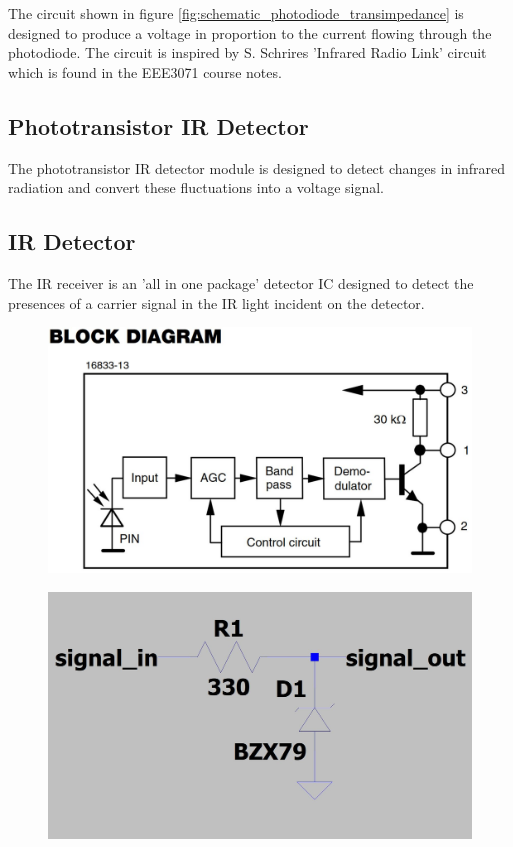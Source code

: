 The circuit shown in figure \ref{fig:schematic_photodiode_transimpedance} is designed to produce a voltage in proportion to the current flowing through the photodiode. The circuit is inspired by S. Schrires 'Infrared Radio Link' circuit which is found in the EEE3071 course notes\cite{Schrire2007}.

\subsection{Phototransistor IR Detector}


The phototransistor IR detector module is designed to detect changes in infrared radiation and convert these fluctuations into a voltage signal.

\subsection{IR Detector}

The IR receiver is an 'all in one package' detector IC designed to detect the presences of a carrier signal in the IR light incident on the detector.

\begin{figure}[H]
	\centering
	\begin{minipage}{.5\textwidth}
		\centering
		\includegraphics[width=.8\linewidth]{figures/design/TSOP382_block_diagram}
		\label{fig:tsop382_block_diagram}
	\end{minipage}%
	\begin{minipage}{.5\textwidth}
		\centering
		\includegraphics[width=.8\linewidth]{figures/design/over_voltage_protection}
		\label{fig:schematic_voltage_clamp}
	\end{minipage}
\end{figure}

